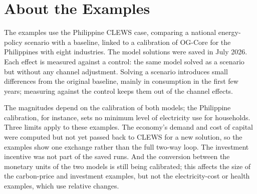 \section{About the Examples}
\label{sec:examples}

The examples use the Philippine CLEWS case, comparing a national energy-policy scenario
with a baseline, linked to a calibration of OG-Core for the Philippines with eight
industries. The model solutions were saved in July 2026. Each effect is measured against a
control: the same model solved as a scenario but without any channel adjustment. Solving a
scenario introduces small differences from the original baseline, mainly in consumption in
the first few years; measuring against the control keeps them out of the channel effects.

The magnitudes depend on the calibration of both models; the Philippine calibration, for
instance, sets no minimum level of electricity use for households. Three limits apply to
these examples. The economy's demand and cost of capital were computed but not yet passed back
to CLEWS for a new solution, so the examples show one exchange rather than the full
two-way loop. The investment incentive was not part of the saved runs. And the conversion
between the monetary units of the two models is still being calibrated; this affects the
size of the carbon-price and investment examples, but not the electricity-cost or health
examples, which use relative changes.

